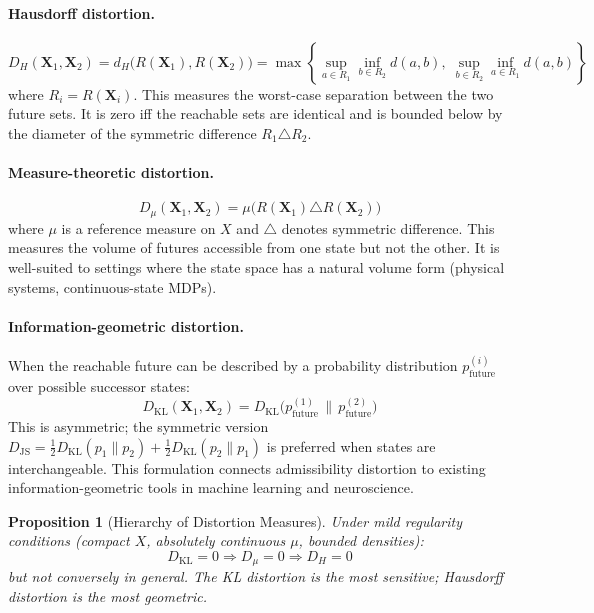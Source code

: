 \documentclass[12pt,a4paper]{article}
\newtheorem{proposition}[theorem]{Proposition}
\begin{document}
\paragraph{Hausdorff distortion.}
\[
D_H(\mathbf{X}_1, \mathbf{X}_2) = d_H\bigl(R(\mathbf{X}_1), R(\mathbf{X}_2)\bigr)
= \max\!\left\{\sup_{a \in R_1}\inf_{b \in R_2}d(a,b),\; \sup_{b \in R_2}\inf_{a \in R_1}d(a,b)\right\}
\]
where $R_i = R(\mathbf{X}_i)$. This measures the worst-case separation between the two future sets. It is zero iff the reachable sets are identical and is bounded below by the diameter of the symmetric difference $R_1 \triangle R_2$.

\paragraph{Measure-theoretic distortion.}
\[
D_\mu(\mathbf{X}_1, \mathbf{X}_2) = \mu\bigl(R(\mathbf{X}_1) \triangle R(\mathbf{X}_2)\bigr)
\]
where $\mu$ is a reference measure on $X$ and $\triangle$ denotes symmetric difference. This measures the volume of futures accessible from one state but not the other. It is well-suited to settings where the state space has a natural volume form (physical systems, continuous-state MDPs).

\paragraph{Information-geometric distortion.}
When the reachable future can be described by a probability distribution $p_{\text{future}}^{(i)}$ over possible successor states:
\[
D_{\mathrm{KL}}(\mathbf{X}_1, \mathbf{X}_2) = D_{\mathrm{KL}}\!\bigl(p_{\text{future}}^{(1)} \,\|\, p_{\text{future}}^{(2)}\bigr)
\]
This is asymmetric; the symmetric version $D_{\mathrm{JS}} = \frac{1}{2}D_{\mathrm{KL}}(p_1\|p_2) + \frac{1}{2}D_{\mathrm{KL}}(p_2\|p_1)$ is preferred when states are interchangeable. This formulation connects admissibility distortion to existing information-geometric tools in machine learning and neuroscience.

\begin{proposition}[Hierarchy of Distortion Measures]
\label{prop:distortion-hierarchy}
Under mild regularity conditions (compact $X$, absolutely continuous $\mu$, bounded densities):
\[
D_{\mathrm{KL}} = 0 \Rightarrow D_\mu = 0 \Rightarrow D_H = 0
\]
but not conversely in general. The KL distortion is the most sensitive; Hausdorff distortion is the most geometric.
\end{proposition}
\end{document}
